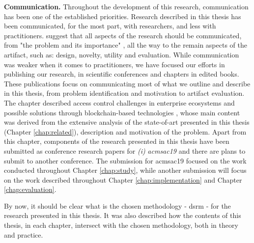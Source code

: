 \textbf{Communication.} Throughout the development of this research, communication has been one of the established priorities. Research described in this thesis has been communicated, for the most part, with researchers, and less with practitioners. \citeauthor{peffers_design_2007} \cite{peffers_design_2007} suggest that all aspects of the research should be communicated, from "the problem and its importance" \cite[14]{peffers_design_2007}, all the way to the remain aspects of the artifact, such as: design, novelty, utility and evaluation. While communication was weaker when it comes to practitioners, we have focused our efforts in publishing our research, in scientific conferences and chapters in edited books. These publications focus on communicating most of what we outline and describe in this thesis, from problem identification and motivation to artifact evaluation. The chapter described access control challenges in enterprise ecosystems and possible solutions through blockchain-based technologies \cite{bryan_christiansen_access_2018}, whose main content was derived from the extensive analysis of the state-of-art presented in this thesis (Chapter \ref{chap:related}), description and motivation of the problem. Apart from this chapter, components of the research presented in this thesis have been submitted as conference research papers for \emph{(i)} \textit{\gls{acmsac19}} and there are plans to submit to another conference. The submission for \gls{acmsac19} focused on the work conducted throughout Chapter \ref{chap:study}, while another submission will focus on the work described throughout Chapter \ref{chap:implementation} and Chapter \ref{chap:evaluation}.

By now, it should be clear what is the chosen methodology - \glsdesc{dsrm} \cite{peffers_design_2007} - for the research presented in this thesis. It was also described how the contents of this thesis, in each chapter, intersect with the chosen methodology, both in theory and practice.